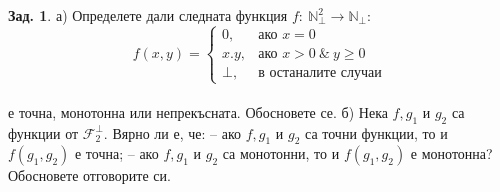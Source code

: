 \documentclass[a4paper,9pt]{extarticle}
\theoremstyle{definition}
\newtheorem{problem}{Зад.}
\newcommand{\Nat}{\mathbb{N}}
\newcommand{\F}{\mathcal{F}}
\begin{document}
\newpage

\begin{problem} а) Определете дали следната функция $f\!:\ \Nat_\bot^2 \rightarrow \Nat_\bot$: 
    $$f(x,y) =
  \begin{cases}
   0, & \text{ако } x=0\\
    x.y, & \text{ако } x>0\ \&\ y\geq 0\\
   \bot, & \text{в останалите случаи} 
  \end{cases}
$$ \\
е точна, монотонна или непрекъсната. Обосновете се.
\vskip3pt
б) Нека  $f, g_1$ и $ g_2$ са  функции от $\F_2^\bot$. Вярно ли е, че:
\vskip2pt
--   ако $f, g_1$ и $ g_2$ са точни функции, то и $f(g_1, g_2)$   е точна;
\vskip2pt
--   ако $f, g_1$ и $g_2$ са монотонни, то и $f(g_1, g_2)$  е монотонна?
\vskip2pt
Обосновете отговорите си.
\end{problem}
\end{document}
